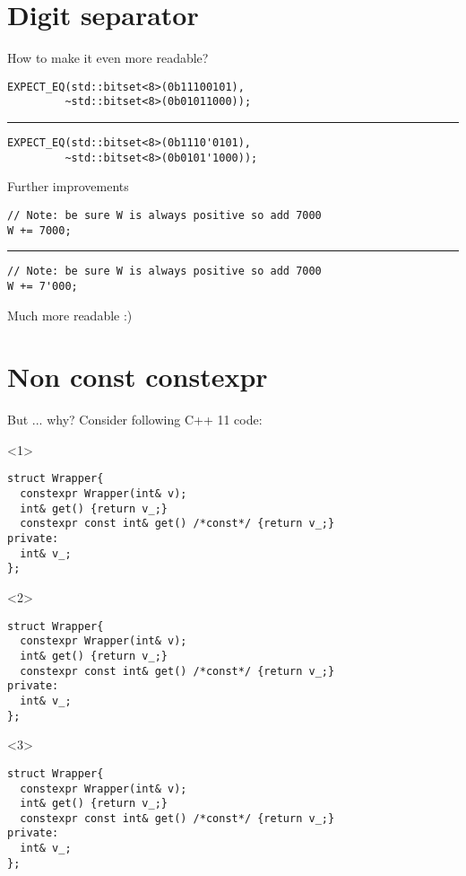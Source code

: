 \documentclass[10pt]{beamer}
\begin{document}
\section{Digit separator}
\begin{frame}[fragile]{How to make it even more readable?}
\vfill
\begin{verbatim}
EXPECT_EQ(std::bitset<8>(0b11100101),
         ~std::bitset<8>(0b01011000));
\end{verbatim}
\vfill
\pause
\hrule
\vfill
\begin{verbatim}
EXPECT_EQ(std::bitset<8>(0b1110'0101),
         ~std::bitset<8>(0b0101'1000));
\end{verbatim}
\vfill
\end{frame}

\begin{frame}[fragile]{Further improvements}
	\begin{verbatim}
// Note: be sure W is always positive so add 7000
W += 7000;
	\end{verbatim}

	\pause 
	\hrule
	\begin{verbatim}
// Note: be sure W is always positive so add 7000
W += 7'000;	
	\end{verbatim}

	Much more readable :)

\end{frame}

\section{Non const constexpr}
\begin{frame}[fragile]{But ... why?}
	\centering Consider following C++ 11 code:

	\begin{onlyenv}
	\begin{verbatim}
struct Wrapper{
  constexpr Wrapper(int& v);
  int& get() {return v_;}
  constexpr const int& get() /*const*/ {return v_;} 
private:
  int& v_;
};
	\end{verbatim}
	\end{onlyenv}

	\begin{onlyenv}
	\begin{verbatim}
struct Wrapper{
  constexpr Wrapper(int& v);
  int& get() {return v_;}
  constexpr const int& get() /*const*/ {return v_;} 
private:
  int& v_;
};
	\end{verbatim}
	\end{onlyenv}

	\begin{onlyenv}
	\begin{verbatim}
struct Wrapper{
  constexpr Wrapper(int& v);
  int& get() {return v_;}
  constexpr const int& get() /*const*/ {return v_;} 
private:
  int& v_;
};
	\end{verbatim}
	\end{onlyenv}
\end{frame}
\end{document}
